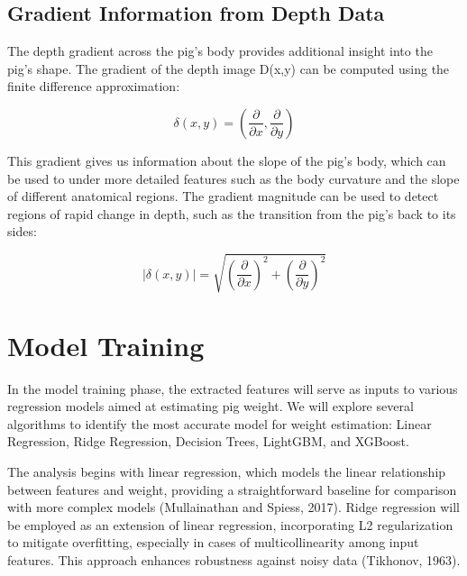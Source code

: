 {\subsection{Gradient Information from Depth Data}
The depth gradient across the pig’s body provides additional insight into the pig’s shape. The gradient of the depth image D(x,y) can be computed using the finite difference approximation:

\begin{equation}
	\delta(x,y)= (\frac{\partial}{\partial x} , \frac{\partial}{\partial y})
\end{equation}

This gradient gives us information about the slope of the pig’s body, which can be used to under more detailed features such as the body curvature and the slope of different anatomical regions. The gradient magnitude can be used to detect regions of rapid change in depth, such as the transition from the pig’s back to its sides:

\begin{equation}
	\left| \delta(x,y) \right| = \sqrt{\left( \frac{\partial}{\partial x} \right)^2 + \left( \frac{\partial}{\partial y} \right)^2}
\end{equation}

\section{Model Training}
In the model training phase, the extracted features will serve as inputs to various regression models aimed at estimating pig weight. We will explore several algorithms to identify the most accurate model for weight estimation: Linear Regression, Ridge Regression, Decision Trees, LightGBM, and XGBoost.

The analysis begins with linear regression, which models the linear relationship between features and weight, providing a straightforward baseline for comparison with more complex models (Mullainathan and Spiess, 2017). Ridge regression will be employed as an extension of linear regression, incorporating L2 regularization to mitigate overfitting, especially in cases of multicollinearity among input features. This approach enhances robustness against noisy data (Tikhonov, 1963).

}
